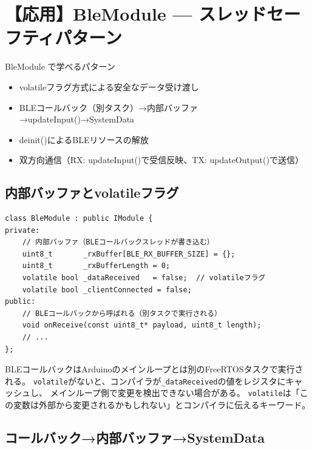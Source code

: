 \section{【応用】BleModule — スレッドセーフティパターン}

\begin{patternbox}{BleModule で学べるパターン}
\begin{itemize}
    \item volatileフラグ方式による安全なデータ受け渡し
    \item BLEコールバック（別タスク）→内部バッファ→updateInput()→SystemData
    \item deinit()によるBLEリソースの解放
    \item 双方向通信（RX: updateInput()で受信反映、TX: updateOutput()で送信）
\end{itemize}
\end{patternbox}

\subsection{内部バッファとvolatileフラグ}

\begin{lstlisting}[style=cppstyle, caption={BleModule.h — 内部バッファ}]
class BleModule : public IModule {
private:
    // 内部バッファ（BLEコールバックスレッドが書き込む）
    uint8_t       _rxBuffer[BLE_RX_BUFFER_SIZE] = {};
    uint8_t       _rxBufferLength = 0;
    volatile bool _dataReceived   = false;  // volatileフラグ
    volatile bool _clientConnected = false;
public:
    // BLEコールバックから呼ばれる（別タスクで実行される）
    void onReceive(const uint8_t* payload, uint8_t length);
    // ...
};
\end{lstlisting}

\begin{cautionbox}[なぜvolatileが必要か]
BLEコールバックはArduinoのメインループとは別のFreeRTOSタスクで実行される。
\texttt{volatile}がないと、コンパイラが\texttt{\_dataReceived}の値をレジスタにキャッシュし、
メインループ側で変更を検出できない場合がある。
\texttt{volatile}は「この変数は外部から変更されるかもしれない」とコンパイラに伝えるキーワード。
\end{cautionbox}

\subsection{コールバック→内部バッファ→SystemData}

